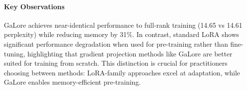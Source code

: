 \paragraph{Key Observations}
GaLore achieves near-identical performance to full-rank training (14.65 vs 14.61 perplexity) while reducing memory by 31\%. In contrast, standard LoRA shows significant performance degradation when used for pre-training rather than fine-tuning, highlighting that gradient projection methods like GaLore are better suited for training from scratch. This distinction is crucial for practitioners choosing between methods: LoRA-family approaches excel at adaptation, while GaLore enables memory-efficient pre-training.
